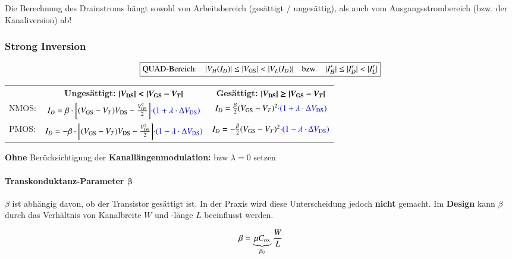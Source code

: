 Die Berechnung des Drainstroms hängt sowohl von Arbeitsbereich (gesättigt / ungesättig), als auch vom Ausgangsstrombereich (bzw. der Kanaliversion) ab!


\subsubsection{Strong Inversion}
\label{Strong Inversion}

\vspace{-0.3cm}

\[ \boxed{ \text{QUAD-Bereich:} \quad |V_H(I_D)| \leq |V_{\rm GS}| < |V_L(I_D)| \quad \text{bzw.} \quad |I_H'| \leq |I_D'| < |I_L'| } \] 

\resizebox{\columnwidth}{!}
{
    \renewcommand{\arraystretch}{1.5}
    \begin{tabular}{@{}l c | c@{}}
                & \textbf{Ungesättigt:} \quad $\bm{| V_{\rm DS} | < | V_{\rm GS} - V_T |}$                                                              & \textbf{Gesättigt:} \quad $\bm{| V_{\rm DS} | \geq | V_{\rm GS} - V_T |}$                         \\
        NMOS:   & $I_D = \beta \cdot \bigg[ (V_{\rm GS} - V_T) V_{\rm DS} - \frac{V_{\rm DS}^2}{2} \bigg] {\color{blue}\cdot (1 + \lambda \cdot \Delta V_{\rm DS})}$    & $I_D = \frac{\beta}{2} (V_{\rm GS} - V_T)^2 {\color{blue}\cdot (1 + \lambda \cdot \Delta V_{\rm DS})}$    \\
        \midrule
        PMOS:   & $I_D = - \beta \cdot \bigg[ (V_{\rm GS} - V_T) V_{\rm DS} - \frac{V_{\rm DS}^2}{2} \bigg] {\color{blue}\cdot (1 - \lambda \cdot \Delta V_{\rm DS})}$  & $I_{D} = - \frac{\beta}{2} (V_{\rm GS} - V_T)^2 {\color{blue}\cdot (1 - \lambda \cdot \Delta V_{\rm DS})}$
    \end{tabular}
    \renewcommand{\arraystretch}{1}
}

\medskip

\textbf{Ohne} Berücksichtigung der \textbf{Kanallängenmodulation:}  bzw $\lambda = 0$ setzen



\paragraph{Transkonduktanz-Parameter $\bm{\beta}$}

\begin{minipage}[c]{0.78\columnwidth}
    $\beta$ ist abhängig davon, ob der Transistor gesättigt ist. 
    In der Praxis wird diese Unterscheidung jedoch \textbf{nicht} gemacht. 
    Im \textbf{Design} kann $\beta$ durch das Verhältnis von Kanalbreite $W$ und -länge $L$ beeinflusst werden.
\end{minipage}
\hfill
\begin{minipage}[c]{0.2\columnwidth}
    \[ \beta = \underbrace{ \mu C_{\rm ox} }_{\beta_0} \frac{W}{L} \]
\end{minipage}

